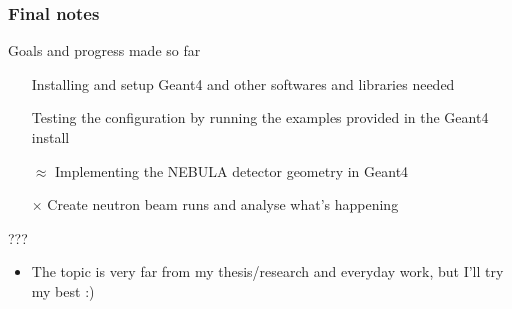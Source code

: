 \begin{frame}
\frametitle{Final notes}

\begin{block}{Goals and progress made so far}
	\begin{itemize}
		\item[{\color{PineGreen} \checkmark}] Installing and setup Geant4 and other softwares and libraries needed
		\item[{\color{PineGreen} \checkmark}] Testing the configuration by running the examples provided in the Geant4 install
		\item[{\color{Dandelion} $\approx$}] Implementing the NEBULA detector geometry in Geant4
		\item[{\color{red} $\boldsymbol{\times}$}] Create neutron beam runs and analyse what's happening
	\end{itemize}
\end{block}

\pause

\begin{alertblock}{???}
	\begin{itemize}
		\item The topic is very far from my thesis/research and everyday work, but I'll try my best :)
	\end{itemize}
\end{alertblock}

\end{frame}